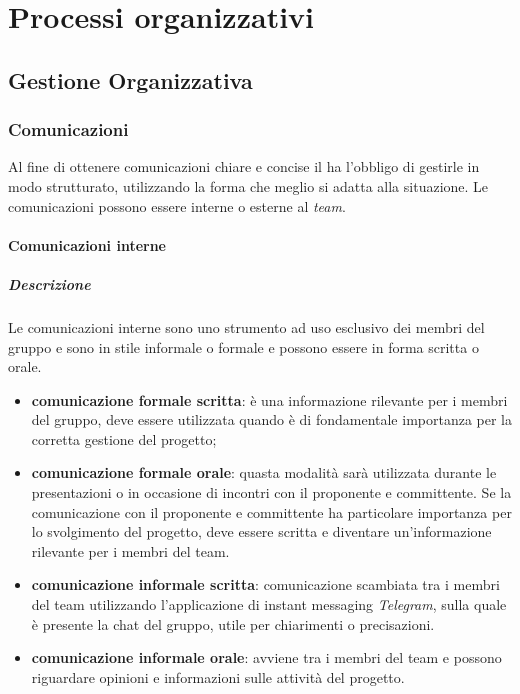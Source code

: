 \newpage

\section{Processi organizzativi}

	\subsection{Gestione Organizzativa}
		
		\subsubsection{Comunicazioni}
		Al fine di ottenere comunicazioni chiare e concise il \textit{\RdP} ha l'obbligo di gestirle in modo strutturato, utilizzando la forma che meglio si adatta alla situazione. Le comunicazioni possono essere interne o esterne al \textit{team}.
			
			\paragraph{Comunicazioni interne}
			\subparagraph{Descrizione}
			Le comunicazioni interne sono uno strumento ad uso esclusivo dei membri del gruppo e sono in stile informale o formale e possono essere in forma scritta o orale. 
				\begin{itemize}
					\item \textbf{comunicazione formale scritta}: è una informazione rilevante per i membri del gruppo, deve essere utilizzata quando è di fondamentale importanza per la corretta gestione del progetto;
					\item \textbf{comunicazione formale orale}: quasta modalità sarà utilizzata durante le presentazioni o in occasione di incontri con il proponente e committente. Se la comunicazione con il proponente e committente ha particolare importanza per lo svolgimento del progetto, deve essere scritta e diventare un'informazione rilevante per i membri del team.
					\item \textbf{comunicazione informale scritta}: comunicazione scambiata tra i membri del team utilizzando l’applicazione di instant messaging \textit{Telegram}, sulla quale è presente la chat del gruppo, utile per chiarimenti o precisazioni.
					\item \textbf{comunicazione informale orale}: avviene tra i membri del team e possono riguardare opinioni e informazioni sulle attività del progetto. 
				\end{itemize}

